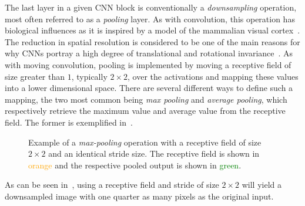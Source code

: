The last layer in a given CNN block is conventionally a \textit{downsampling} operation, most often referred to as a \textit{pooling} layer.
As with convolution, this operation has biological influences as it is inspired by a model of the mammalian visual cortex~\cite[p.~966]{visint-cnn}.
The reduction in spatial resolution is considered to be one of the main reasons for why CNNs portray a high degree of translational and rotational invariance~\cite{cnn-translational-invariance}.
As with moving convolution, pooling is implemented by moving a receptive field of size greater than $1$, typically $2 \times 2$, over the activations and mapping these values into a lower dimensional space.
There are several different ways to define such a mapping, the two most common being \textit{max pooling} and \textit{average pooling}, which respectively retrieve the maximum value and average value from the receptive field.
The former is exemplified in~.

\begin{figure}[htb]
  
  \caption{%
    Example of a \textit{max-pooling} operation with a receptive field of size $2 \times 2$ and an identical stride size.
    The receptive field is shown in \textcolor{orange}{orange} and the respective pooled output is shown in \textcolor{green}{green}.
  }%
  \label{fig:max-pooling}
\end{figure}

As can be seen in~, using a receptive field and stride of size $2 \times 2$ will yield a downsampled image with one quarter as many pixels as the original input.
